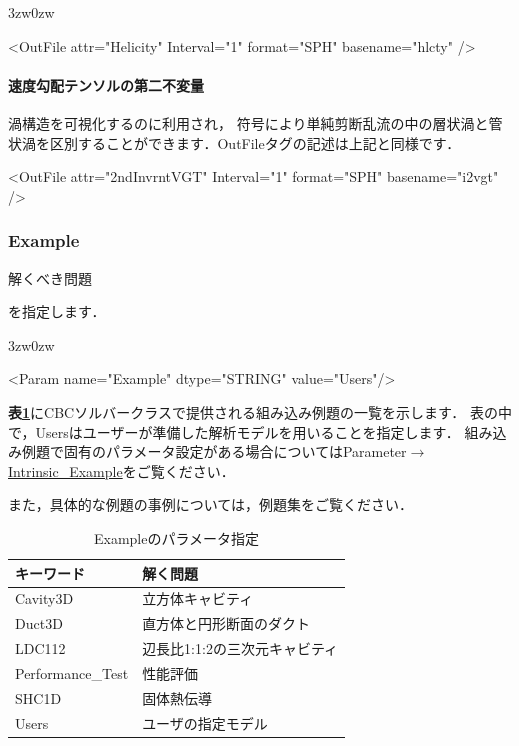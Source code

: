 \begin{indentation}{3zw}{0zw}
{\small
\begin{program}
<OutFile attr="Helicity" Interval="1" format="SPH" basename="hlcty" />
\end{program}
}

%
\paragraph{速度勾配テンソルの第二不変量}
渦構造を可視化するのに利用され，
符号により単純剪断乱流の中の層状渦と管状渦を区別することができます\cite{tanaka:93:PF}．OutFileタグの記述は上記と同様です．
{\small
\begin{program}
<OutFile attr="2ndInvrntVGT" Interval="1" format="SPH" basename="i2vgt" />
\end{program}
}

\end{indentation}



\pagebreak
\subsubsection{Example}

\hypertarget{tgt:example}{解くべき問題}を指定します．

\begin{indentation}{3zw}{0zw}

{\small
\begin{program}
<Param name="Example" dtype="STRING" value="Users"/>
\end{program}
}

\textbf{表\ref{tbl:intrinsic_example}}にCBCソルバークラスで提供される組み込み例題の一覧を示します．
表の中で，Usersはユーザーが準備した解析モデルを用いることを指定します．
組み込み例題で固有のパラメータ設定がある場合についてはParameter$\to$\hyperlink{tgt:intrinsic_example}{Intrinsic\_Example}をご覧ください．

また，具体的な例題の事例については，例題集をご覧ください．

\begin{table}[htdp]
\caption{Exampleのパラメータ指定}
\begin{center}
\small
\begin{tabular}{ll} \toprule
キーワード & 解く問題\\ \midrule
Cavity3D & 立方体キャビティ\\
Duct3D & 直方体と円形断面のダクト\\
LDC112 & 辺長比1:1:2の三次元キャビティ\\
Performance\_Test & 性能評価\\
SHC1D & 固体熱伝導\\
Users & ユーザの指定モデル\\ \bottomrule
\end{tabular}
\end{center}
\label{tbl:intrinsic_example}
\end{table}

\end{indentation}


